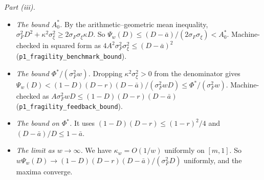 \emph{Part (iii).}
\begin{itemize}[itemsep=1pt,topsep=2pt]
\item \emph{The bound $A^*_0$.} By the arithmetic--geometric mean inequality, $\sigma_F^2D^2+\kappa^2\sigma_\xi^2\ge2\sigma_F\sigma_\xi\kappa D$. So $\Psi_w(D)\le(D-\bar a)/(2\sigma_F\sigma_\xi)<A^*_0$. Machine-checked in squared form as $4A^2\sigma_F^2\sigma_\xi^2\le(D-\bar a)^2$ (\nolinkurl{p1_fragility_benchmark_bound}).
\item \emph{The bound $\Phi^*/(\sigma_F^2w)$.} Dropping $\kappa^2\sigma_\xi^2>0$ from the denominator gives $\Psi_w(D)<(1-D)(D-r)(D-\bar a)/(\sigma_F^2wD)\le\Phi^*/(\sigma_F^2w)$. Machine-checked as $A\sigma_F^2wD\le(1-D)(D-r)(D-\bar a)$ (\nolinkurl{p1_fragility_feedback_bound}).
\item \emph{The bound on $\Phi^*$.} It uses $(1-D)(D-r)\le(1-r)^2/4$ and $(D-\bar a)/D\le1-\bar a$.
\item \emph{The limit as $w\to\infty$.} We have $\kappa_w=O(1/w)$ uniformly on $[m,1]$. So $w\Psi_w(D)\to(1-D)(D-r)(D-\bar a)/(\sigma_F^2D)$ uniformly, and the maxima converge.
\end{itemize}

